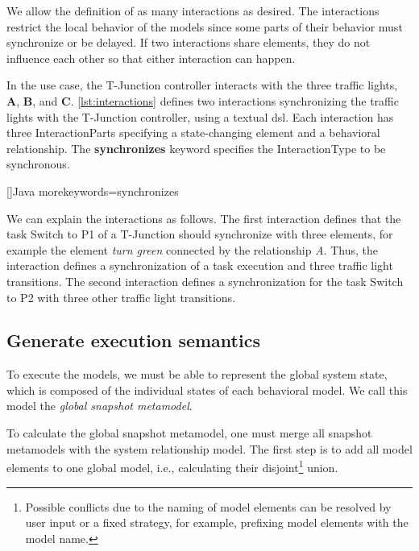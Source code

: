 \documentclass{jot}
\begin{document}
We allow the definition of as many interactions as desired.
The interactions restrict the local behavior of the models since some parts of their behavior must synchronize or be delayed.
If two interactions share elements, they do not influence each other so that either interaction can happen.

In the use case, the T-Junction controller interacts with the three traffic lights, \textbf{A}, \textbf{B}, and \textbf{C}.
\autoref{lst:interactions} defines two interactions synchronizing the traffic lights with the T-Junction controller, using a textual \gls*{dsl}.
Each interaction has three \textsf{InteractionPart}s specifying a state-changing element and a behavioral relationship.
The \textbf{synchronizes} keyword specifies the \textsf{InteractionType} to be \textsf{synchronous}.

[]{Java}{
    morekeywords={synchronizes}
}




We can explain the interactions as follows.
The first interaction defines that the task \textsf{Switch to P1} of a \textsf{T-Junction} should synchronize with three elements, for example the element \textit{turn green} connected by the relationship \textit{A}.
Thus, the interaction defines a synchronization of a task execution and three traffic light transitions. 
The second interaction defines a synchronization for the task \textsf{Switch to P2} with three other traffic light transitions.

\subsection{Generate execution semantics} \label{subsec:executionSemantics}
To execute the models, we must be able to represent the global system state, which is composed of the individual states of each behavioral model.
We call this model the \emph{global snapshot metamodel}.

To calculate the global snapshot metamodel, one must merge all snapshot metamodels with the system relationship model.
The first step is to add all model elements to one global model, i.e., calculating their disjoint\footnote{Possible conflicts due to the naming of model elements can be resolved by user input or a fixed strategy, for example, prefixing model elements with the model name.} union.
\end{document}
